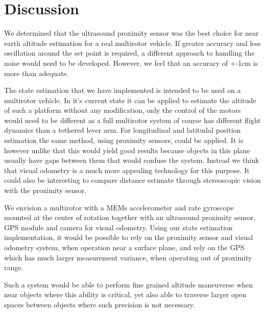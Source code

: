 \section{Discussion}
We determined that the ultrasound proximity sensor was the best choice for near earth altitude estimation for a real multirotor 
vehicle. If greater accuracy and less oscillation around the set point is required, a different approach to handling the noise would
need to be developed. However, we feel that an accurary of +-1cm is more than adequate.

The state estimation that we have implemented is intended to be used on a multirotor vehicle. In it's current state it can be applied
to estimate the altitude of such a platform without any modification, only the control of the motors would need to be different as 
a full multirotor system 
of course has different flight dynamics than a tethered lever arm. For longitudinal and latitudal position estimation the same method,
using proximity sensors, could be applied. It is however unlike that this would yield good results because objects in this plane usually
have gaps between them that would confuse the system. Instead we think that visual odometry\cite{Nister2004} is a much more
appealing technology for this
purpose. It could also be interesting to compare distance estimate through stereoscopic vision with the proximity sensor.

We envision a multirotor with a MEMs accelerometer and rate gyroscope
mounted at the center of rotation together with an ultrasound proximity sensor, GPS module and camera for visual odometry.
Using our state estimation implementation,
it would be possible to rely on the proximity sensor and visual odometry system, when operation near a surface plane, and rely
on the GPS which has much larger 
measurement variance, when operating out of proximity range.

Such a system would be able to perform fine grained altitude maneuverse when near objects where this ability is critical, yet also able
to traverse larger open spaces between objects where such precision is not necessary.
